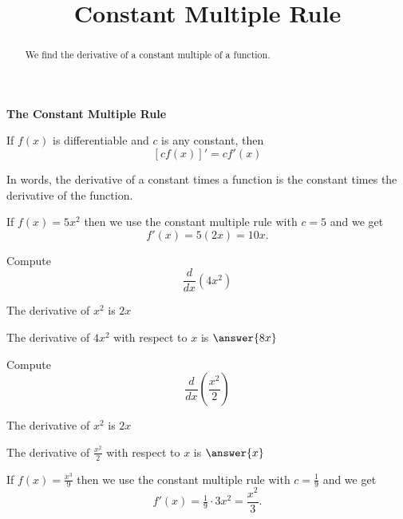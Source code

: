 \documentclass[handout]{ximera}
\title{Constant Multiple Rule}
\begin{document}
\begin{abstract}
We find the derivative of a constant multiple of a 
function.
\end{abstract}



\maketitle


\begin{center}
\bf{The Constant Multiple Rule}
\end{center}


\begin{theorem} If $f(x)$ is differentiable and $c$ is any constant, then
\[[cf(x)]' = c f'(x)\]
\end{theorem}

In words, the derivative of a constant times a function is the constant times the derivative of the function.\\



\begin{example} %
 If $f(x) = 5x^2$ then  we use the constant multiple rule with $c = 5$ and we get 
\[
f'(x) = 5(2x)  = 10x.
\]
\end{example}


\begin{problem} %
  Compute 
  \[
  \frac{d}{dx} \left(4x^2\right)
  \]
  
    \begin{hint}
      The derivative of $x^2$ is $2x$
    \end{hint}    
		The derivative of $4x^2$ with respect to $x$ is
		 $\answer{8x}$
	
\end{problem}


\begin{problem} %
  Compute 
  \[
  \frac{d}{dx} \left(\frac{x^2}{2}\right)
  \]
  
    \begin{hint}
      The derivative of $x^2$ is $2x$
    \end{hint}    
		The derivative of $\frac{x^2}{2}$ with respect to $x$ is
		 $\answer{x}$
	
\end{problem}


\begin{example} %
 If $f(x) = \frac{x^3}{9}$ then  we use the constant multiple rule with $c = \frac19$ and we get 
\[
f'(x) = \tfrac19 \cdot 3x^2 
= \frac{x^2}{3}.
\]
\end{example}
\end{document}

